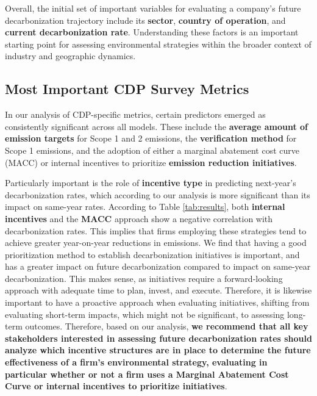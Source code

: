 Overall, the initial set of important variables for evaluating a company's future decarbonization trajectory include its \textbf{sector}, \textbf{country of operation}, and \textbf{current decarbonization rate}. Understanding these factors is an important starting point for assessing environmental strategies within the broader context of industry and geographic dynamics.

\subsection{Most Important CDP Survey Metrics}

In our analysis of CDP-specific metrics, certain predictors emerged as consistently significant across all models. These include the \textbf{average amount of emission targets} for Scope 1 and 2 emissions, the \textbf{verification method} for Scope 1 emissions, and the adoption of either a marginal abatement cost curve (MACC) or internal incentives to prioritize \textbf{emission reduction initiatives}.

Particularly important is the role of \textbf{incentive type} in predicting next-year's decarbonization rates, which according to our analysis is more significant than its impact on same-year rates. According to Table \ref{tab:results}, both \textbf{internal incentives} and the \textbf{MACC} approach show a negative correlation with decarbonization rates. This implies that firms employing these strategies tend to achieve greater year-on-year reductions in emissions. We find that having a good prioritization method to establish decarbonization initiatives is important, and has a greater impact on future decarbonization compared to impact on same-year decarbonization. This makes sense, as initiatives require a forward-looking approach with adequate time to plan, invest, and execute. Therefore, it is likewise important to have a proactive approach when evaluating initiatives, shifting from evaluating short-term impacts, which might not be significant, to assessing long-term outcomes. Therefore, based on our analysis, \textbf{we recommend that all key stakeholders interested in assessing future decarbonization rates should analyze which incentive structures are in place to determine the future effectiveness of a firm's environmental strategy, evaluating in particular whether or not a firm uses a Marginal Abatement Cost Curve or internal incentives to prioritize initiatives}.

